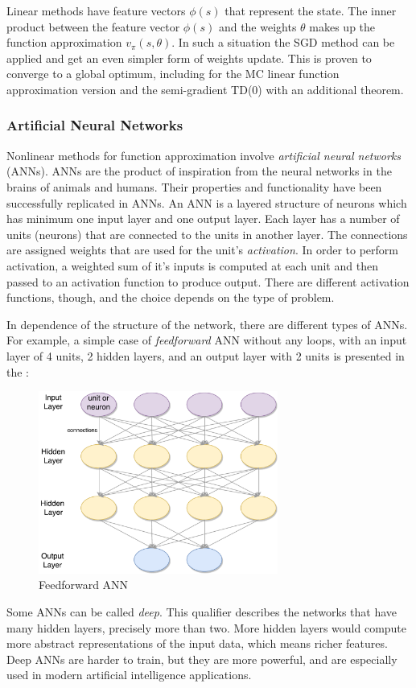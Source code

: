 Linear methods have feature vectors $\phi(s)$ that represent the state. The inner product between the feature vector $\phi(s)$ and the weights $\theta$ makes up the function approximation $v_{\pi}(s,\theta)$. In such a situation the SGD method can be applied and get an even simpler form of weights update. This is proven to converge to a global optimum, including for the MC linear function approximation version and the semi-gradient TD(0) with an additional theorem.

\subsubsection{Artificial Neural Networks}
Nonlinear methods for function approximation involve \textit{artificial neural networks} (ANNs). ANNs are the product of inspiration from the neural networks in the brains of animals and humans. Their properties and functionality have been successfully replicated in ANNs. An ANN is a layered structure of neurons which has minimum one input layer and one output layer. Each layer has a number of units (neurons) that are connected to the units in another layer. The connections are assigned weights that are used for the unit's \textit{activation}. In order to perform activation, a weighted sum of it's inputs is computed at each unit and then passed to an activation function to produce output. There are different activation functions, though, and the choice depends on the type of problem.

In dependence of the structure of the network, there are different types of ANNs. For example, a simple case of \textit{feedforward} ANN without any loops, with an input layer of 4 units, 2 hidden layers, and an output layer with 2 units is presented in the :
\begin{figure}[H]
	\centering
	\includegraphics[width=0.7\textwidth]{Figures/Feedforward}
	\caption{Feedforward ANN}
	\label{fig:feedforward}
\end{figure}
Some ANNs can be called \textit{deep}. This qualifier describes the networks that have many hidden layers, precisely more than two. More hidden layers would compute more abstract representations of the input data, which means richer features. Deep ANNs are harder to train, but they are more powerful, and are especially used in modern artificial intelligence applications.

